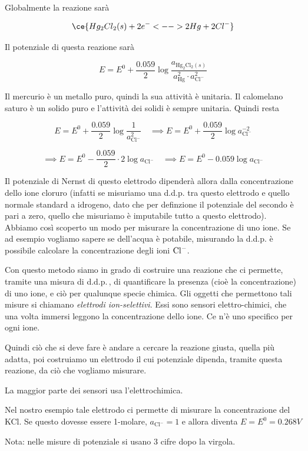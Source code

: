 Globalmente la reazione sarà

$$\ce{Hg_2Cl_2(s) + 2e^- <--> 2Hg + 2Cl^-}$$

Il potenziale di questa reazione sarà

$$E=E^0 + \frac{0.059}{2} \log \frac{a_{\text{Hg}_2\text{Cl}_2(s)}}{a^2_{\text{Hg}} \cdot a^2_{\text{Cl}^-}}$$

Il mercurio è un metallo puro, quindi la sua attività è unitaria. Il calomelano saturo è un solido puro e l'attività dei solidi è sempre unitaria. Quindi resta

$$E=E^0 + \frac{0.059}{2} \log \frac{1}{a^2_{\text{Cl}^-}}\quad
\implies E=E^0 + \frac{0.059}{2} \log a^{-2}_{\text{Cl}^-}$$

$$\implies E=E^0 - \frac{0.059}{2} \cdot 2 \log a_{\text{Cl}^-}
\quad
\implies E=E^0 - 0.059 \log a_{\text{Cl}^-}$$

Il potenziale di Nernst di questo elettrodo dipenderà allora dalla concentrazione dello ione cloruro (infatti se misuriamo una d.d.p. tra questo elettrodo e quello normale standard a idrogeno, dato che per definzione il potenziale del secondo è pari a zero, quello che misuriamo è imputabile tutto a questo elettrodo). Abbiamo così scoperto un modo per misurare la concentrazione di uno ione. Se ad esempio vogliamo sapere se dell'acqua è potabile, misurando la d.d.p. è possibile calcolare la concentrazione degli ioni $\rm Cl^-$.

Con questo metodo siamo in grado di costruire una reazione che ci permette, tramite una misura di d.d.p.\,, di quantificare la presenza (cioè la concentrazione) di uno ione, e ciò per qualunque specie chimica. Gli oggetti che permettono tali misure si chiamano \textit{elettrodi ion-selettivi}. Essi sono sensori elettro-chimici, che una volta immersi leggono la concentrazione dello ione. Ce n'è uno specifico per ogni ione.

Quindi ciò che si deve fare è andare a cercare la reazione giusta, quella più adatta, poi costruiamo un elettrodo il cui potenziale dipenda, tramite questa reazione, da ciò che vogliamo misurare.

La maggior parte dei sensori usa l'elettrochimica.

Nel nostro esempio tale elettrodo ci permette di misurare la concentrazione del KCl. Se questo dovesse essere 1-molare, $a_{\text{Cl}^-}=1$ e allora diventa $E=E^0=0.268 V$

\vspace{0.2cm}Nota: nelle misure di potenziale si usano 3 cifre dopo la virgola.

